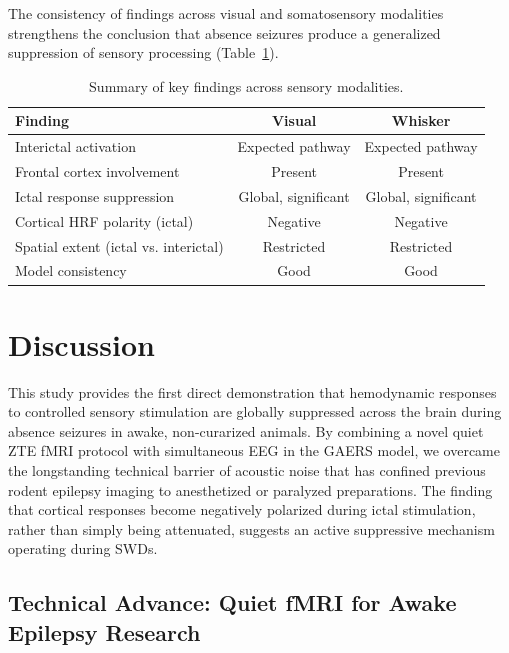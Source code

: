\documentclass[12pt]{article}
\begin{document}
The consistency of findings across visual and somatosensory modalities strengthens the conclusion that absence seizures produce a generalized suppression of sensory processing (Table~\ref{tab:summary}).

\begin{table}[htbp]
\centering
\caption{Summary of key findings across sensory modalities.}
\label{tab:summary}
\begin{tabular}{lcc}
\toprule
Finding & Visual & Whisker \\
\midrule
Interictal activation & Expected pathway & Expected pathway \\
Frontal cortex involvement & Present & Present \\
Ictal response suppression & Global, significant & Global, significant \\
Cortical HRF polarity (ictal) & Negative & Negative \\
Spatial extent (ictal vs. interictal) & Restricted & Restricted \\
Model consistency & Good & Good \\
\bottomrule
\end{tabular}
\end{table}

\section{Discussion}

This study provides the first direct demonstration that hemodynamic responses to controlled sensory stimulation are globally suppressed across the brain during absence seizures in awake, non-curarized animals. By combining a novel quiet ZTE fMRI protocol with simultaneous EEG in the GAERS model, we overcame the longstanding technical barrier of acoustic noise that has confined previous rodent epilepsy imaging to anesthetized or paralyzed preparations. The finding that cortical responses become negatively polarized during ictal stimulation, rather than simply being attenuated, suggests an active suppressive mechanism operating during SWDs.

\subsection{Technical Advance: Quiet fMRI for Awake Epilepsy Research}
\end{document}
